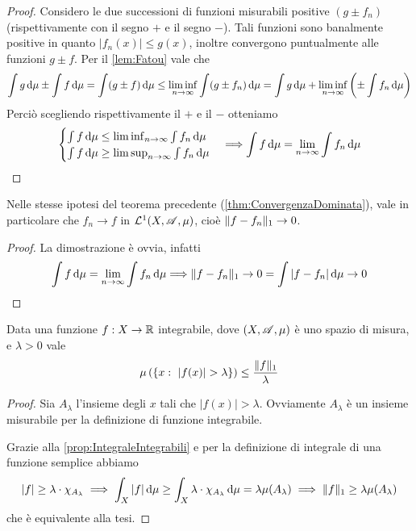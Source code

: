\begin{proof}
	Considero le due successioni di funzioni misurabili positive $(g\pm f_n)$ (rispettivamente con il segno $+$ e il segno $-$). Tali funzioni sono banalmente positive in quanto $|f_n(x)|\le g(x)$, inoltre convergono puntualmente alle funzioni $g\pm f$. Per il \cref{lem:Fatou} vale che
	\begin{equation*}
		\int g\,\mathrm d\mu\pm\int f\,\mathrm d\mu=\int (g\pm f) \,\mathrm d\mu \le \liminf_{n\to\infty} \int (g\pm f_n) \,\mathrm d\mu=\int g\,\mathrm d\mu +\liminf_{n\to\infty}\left( \pm\int f_n \,\mathrm d \mu\right)
	\end{equation*}
	Perciò scegliendo rispettivamente il $+$ e il $-$ otteniamo
	\begin{equation*}
		\begin{cases}
			\int f \,\mathrm d\mu\le \liminf_{n\to\infty}\int f_n \,\mathrm d \mu \\
			\int f\,\mathrm d\mu \ge \limsup_{n\to\infty}\int f_n \,\mathrm d \mu
		\end{cases}
		\Longrightarrow \int f\,\mathrm d\mu = \lim_{n\to\infty}\int f_n \,\mathrm d \mu
	\end{equation*}

\end{proof}

\begin{corollary}
	Nelle stesse ipotesi del teorema precedente (\cref{thm:ConvergenzaDominata}), vale in particolare che $f_n\to f$ in $\mathcal L^1(X,\mathscr A,\mu)$, cioè $\Vert f-f_n\Vert_1\to 0$.
\end{corollary}
\begin{proof}
	La dimostrazione è ovvia, infatti 
	\begin{equation*}
		\int f \,\mathrm d\mu=\lim_{n\to\infty}\int f_n\,\mathrm d\mu \Longrightarrow \Vert f-f_n\Vert_1\to 0=\int |f-f_n|\,\mathrm d\mu\to 0
	\end{equation*}

\end{proof}



\begin{theorem}\label{thm:DisuguaglianzaChebyshev}
	Data una funzione $f:X\to\mathbb R$ integrabile, dove $(X,\mathscr A,\mu)$ è uno spazio di misura, e $\lambda>0$ vale
	\begin{equation*}
		\mu\left(\left\{x:\ |f(x)|>\lambda\right\}\right) \le \frac{\LNorm f}{\lambda}
	\end{equation*}
\end{theorem}
\begin{proof}
	Sia $A_\lambda$ l'insieme degli $x$ tali che $|f(x)|>\lambda$. Ovviamente $A_\lambda$ è un insieme misurabile per la definizione di funzione integrabile.
	
	Grazie alla \cref{prop:IntegraleIntegrabili} e per la definizione di integrale di una funzione semplice abbiamo
	\begin{equation*}
		|f|\ge\lambda \cdot \chi_{A_\lambda} \implies \int_X |f|\,\mathrm d\mu \ge \int_X \lambda\cdot\chi_{A_\lambda}\,\mathrm d\mu=\lambda\mu(A_\lambda)\implies
		\Vert f\Vert_1\ge \lambda\mu(A_\lambda)
	\end{equation*}
	che è equivalente alla tesi.
\end{proof}

